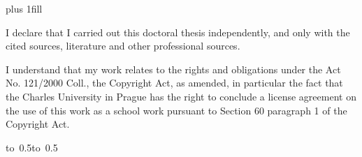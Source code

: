 \documentclass[12pt,a4paper,twoside,openright,natbib]{book}
\begin{document}
\newpage


\vglue 0pt plus 1fill

\noindent
I declare that I carried out this doctoral thesis independently, and only with the cited sources, literature and other professional sources.

\medskip\noindent
I understand that my work relates to the rights and obligations under the Act No. 121/2000 Coll., the Copyright Act, as amended, in particular the fact that the Charles University in Prague has the right to conclude a license agreement on the use of this work as a school work pursuant to Section 60 paragraph 1 of the Copyright Act.

\vspace{10mm}

\hbox{\hbox to 0.5\hbox to 0.5}

\vspace{20mm}
\newpage

\end{document}
